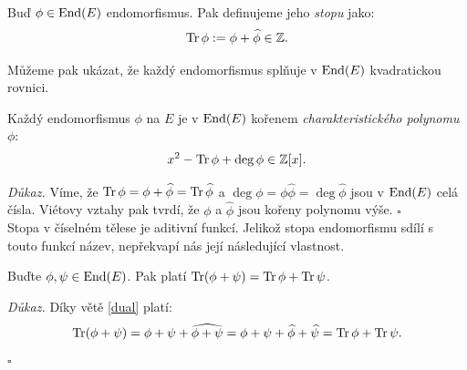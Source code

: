 \documentclass[12pt]{report}
\begin{document}
\begin{definice}
Buď $\phi \in \operatorname{End}(E)$ endomorfismus. Pak definujeme jeho \textit{stopu} jako:
\begin{equation*}
\operatorname{Tr} \phi := \phi+\widehat{\phi} \in \mathbb{Z}.
\end{equation*}
\end{definice} 

Můžeme pak ukázat, že každý endomorfismus splňuje v $\operatorname{End}(E)$ kvadratickou rovnici. 
\begin{veta}
Každý endomorfismus $\phi$ na $E$ je v $\operatorname{End}(E)$ kořenem \textit{charakteristického polynomu} $\phi$:
\begin{equation*}
x^2 - \operatorname{Tr} \phi + \deg \phi \in \mathbb{Z}[x].
\end{equation*}
\end{veta}
\noindent \textit{Důkaz.} Víme, že $\operatorname{Tr} \phi = \phi+ \widehat{\phi} = \operatorname{Tr} \widehat{\phi}$ a $\deg \phi = \phi \widehat{\phi} = \deg \widehat{\phi}$ jsou v $\operatorname{End}(E)$ celá čísla. Viétovy vztahy pak tvrdí, že $\phi$ a $\widehat{\phi}$ jsou kořeny polynomu výše. \hfill $\square$\\

Stopa v číselném tělese je aditivní funkcí. Jelikož stopa endomorfismu sdílí s touto funkcí název, nepřekvapí nás její následující vlastnost.

\begin{lemma}
Buďte $\phi, \psi \in \operatorname{End}(E)$. Pak platí $\operatorname{Tr} (\phi+\psi) = \operatorname{Tr} \phi + \operatorname{Tr} \psi$.
\end{lemma}
\noindent \textit{Důkaz.} Díky větě \ref{dual} platí:
\begin{equation*}
\operatorname{Tr}  (\phi+\psi) = \phi+\psi+\widehat{\phi+\psi} = \phi+\psi+\widehat{\phi}+\widehat{\psi} = \operatorname{Tr} \phi + \operatorname{Tr} \psi.
\end{equation*}
\hfill $\square$\\
\end{document}
